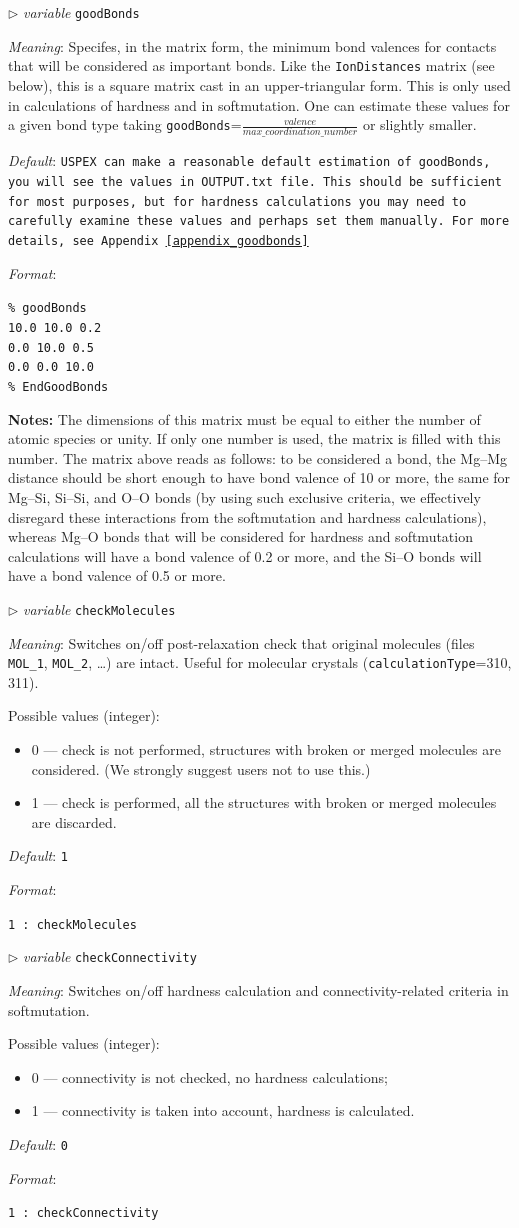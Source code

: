 \documentclass[12pt]{article}
\newcommand{\keyword}[1]{\texttt{#1}}
\newcommand{\file}[1]{\texttt{#1}}
\newcommand{\paramacro}[6]{
\vspace{0.5cm}
$\triangleright$ \emph{variable} {\color{blue} \texttt{#1}}

\emph{Meaning}: {#2}

{#3}

\emph{Default}: \texttt{#4}

\emph{Format}:

{\addtolength{\leftskip}{10mm} 
\texttt{#5}
\par}


{\small #6}

}
\begin{document}
\paramacro{goodBonds}{Specifes, in the matrix form, the minimum bond valences
for contacts that will be considered as important bonds. Like the
\keyword{IonDistances} matrix (see below), this is a square matrix cast in an
upper-triangular form. This is only used in calculations of hardness and in
softmutation. One can estimate these values for a given bond type taking
\keyword{goodBonds}=$\frac{valence}{max\_coordination\_number}$ or slightly
smaller.}{}{\rm USPEX can make a reasonable default estimation of
\keyword{goodBonds}, you will see the values in \file{OUTPUT.txt} file. This
should be sufficient for most purposes, but for hardness calculations you may
need to carefully examine these values and perhaps set them manually. For more
details, see Appendix~\ref{appendix_goodbonds}
}{\% goodBonds \\
10.0 10.0  0.2 \\
 0.0 10.0  0.5 \\
 0.0  0.0 10.0 \\
\% EndGoodBonds }
{\textbf{Notes:} The dimensions of this matrix must be equal to either the
number of atomic species or unity. If only one number is used, the matrix is
filled with this number. The matrix above reads as follows: to be considered a
bond, the Mg--Mg distance should be short enough to have bond valence of 10 or
more, the same for Mg--Si, Si--Si, and O--O bonds (by using such exclusive
criteria, we effectively disregard these interactions from the softmutation and
hardness calculations), whereas Mg--O bonds that will be considered for hardness
and softmutation calculations will have a bond valence of 0.2 or more, and the
Si--O bonds will have a bond valence of 0.5 or more.}


\paramacro{checkMolecules}{Switches on/off post-relaxation check that original
molecules (files \file{MOL\_1}, \file{MOL\_2}, \ldots) are intact. Useful for
molecular crystals (\keyword{calculationType}=310, 311).}{Possible values
(integer):
\begin{itemize}
\item 0 --- check is not performed, structures with broken or merged molecules
are considered. (We strongly suggest users not to use this.)
\item 1 --- check is performed, all the structures with broken or merged
molecules are discarded.
\end{itemize}}{1}{1 : checkMolecules}{}


\paramacro{checkConnectivity}{Switches on/off hardness calculation and
connectivity-related criteria in softmutation.}{Possible values (integer):
\begin{itemize}
\item 0 --- connectivity is not checked, no hardness calculations;
\item 1 --- connectivity is taken into account, hardness is calculated.
\end{itemize}
}{0}{1   : checkConnectivity}{}
\end{document}
